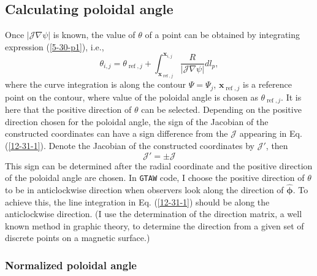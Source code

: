 \documentclass{article}
\newcommand{\code}[1]{\texttt{#1}}
\newcommand{\tmmathbf}[1]{\ensuremath{\boldsymbol{#1}}}
\newcommand{\tmop}[1]{\ensuremath{\operatorname{#1}}}
\begin{document}
\subsection{Calculating poloidal angle}

Once $|\mathcal{J} \nabla \psi |$ is known, the value of $\theta$ of a point
can be obtained by integrating expression (\ref{5-30-p1}), i.e.,
\begin{equation}
  \label{12-31-1} \theta_{i, j} = \theta_{\tmop{ref}, j} +
  \int_{\mathbf{x}_{\tmop{ref}, j}}^{\mathbf{x}_{i, j}} \frac{R}{|\mathcal{J}
  \nabla \psi |} d l_p,
\end{equation}
where the curve integration is along the contour $\Psi = \Psi_j$,
$\mathbf{x}_{\tmop{ref}, j}$ is a reference point on the contour, where value
of the poloidal angle is chosen as $\theta_{\tmop{ref}, j}$. It is here that
the positive direction of $\theta$ can be selected. Depending on the positive
direction chosen for the poloidal angle, the sign of the Jacobian of the
constructed coordinates can have a sign difference from the $\mathcal{J}$
appearing in Eq. (\ref{12-31-1}). Denote the Jacobian of the constructed
coordinates by $\mathcal{J}'$, then
\begin{equation}
  \mathcal{J}' = \pm \mathcal{J}
\end{equation}
This sign can be determined after the radial coordinate and the positive
direction of the poloidal angle are chosen. In {\code{GTAW}} code, I choose
the positive direction of $\theta$ to be in anticlockwise direction when
observers look along the direction of $\hat{\tmmathbf{\phi}}$. To achieve
this, the line integration in Eq. (\ref{12-31-1}) should be along the
anticlockwise direction. (I use the determination of the direction matrix, a
well known method in graphic theory, to determine the direction from a given
set of discrete points on a magnetic surface.)

\subsubsection{Normalized poloidal angle}\label{17-10-19-2}
\end{document}
